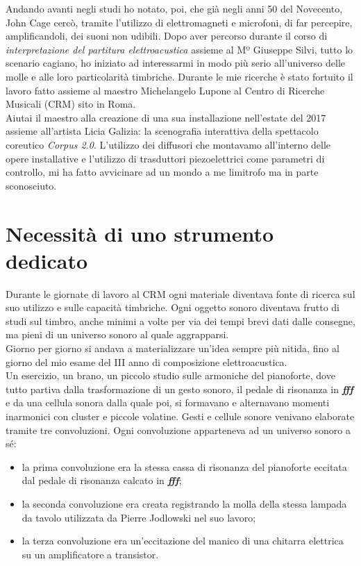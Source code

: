 Andando avanti negli studi ho notato, poi, che già negli anni 50 del Novecento, John Cage cercò, tramite l'utilizzo di elettromagneti e microfoni, di far percepire, amplificandoli, dei suoni non udibili. Dopo aver percorso durante il corso di \textit{interpretazione del partitura elettroacustica} assieme al Mº Giuseppe Silvi, tutto lo scenario cagiano, ho iniziato ad interessarmi in modo più serio all'universo delle molle e alle loro particolarità timbriche. Durante le mie ricerche è stato fortuito il lavoro fatto assieme al maestro Michelangelo Lupone al Centro di Ricerche Musicali (CRM) sito in Roma. \\
Aiutai il maestro alla creazione di una sua installazione nell'estate del 2017 assieme all'artista Licia Galizia: la scenografia interattiva della spettacolo coreutico \textit{Corpus 2.0}. L'utilizzo dei diffusori che montavamo all'interno delle opere installative e l'utilizzo di trasduttori piezoelettrici come parametri di controllo, mi ha fatto avvicinare ad un mondo a me limitrofo ma in parte sconosciuto.

\section{Necessità di uno strumento dedicato}

Durante le giornate di lavoro al CRM ogni materiale diventava fonte di ricerca sul suo utilizzo e sulle capacità timbriche. Ogni oggetto sonoro diventava frutto di studi sul timbro, anche minimi a volte per via dei tempi brevi dati dalle consegne, ma pieni di un universo sonoro al quale aggrapparsi. \\
Giorno per giorno si andava a materializzare un'idea sempre più nitida, fino al giorno del mio esame del III anno di composizione elettroacustica. \\
Un esercizio, un brano, un piccolo studio sulle armoniche del pianoforte, dove tutto partiva dalla trasformazione di un gesto sonoro, il pedale di risonanza in \textit{\textbf{fff}} e da una cellula sonora dalla quale poi, si formavano e alternavano momenti inarmonici con cluster e piccole volatine. Gesti e cellule sonore venivano elaborate tramite tre convoluzioni. Ogni convoluzione apparteneva ad un universo sonoro a sé:

\begin{itemize}
	\item{la prima convoluzione era la stessa cassa di risonanza del pianoforte eccitata dal pedale di risonanza calcato in \textit{\textbf{fff}};}
	\item{la seconda convoluzione era creata registrando la molla della stessa lampada da tavolo utilizzata da Pierre Jodlowski nel suo lavoro;}
	\item{la terza convoluzione era un'eccitazione del manico di una chitarra elettrica su un amplificatore a transistor.}
\end{itemize}

